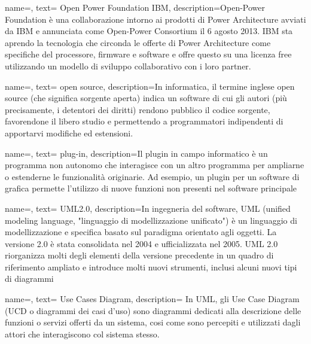 {
    name=,
    text= Open Power Foundation IBM,
    description={Open-Power Foundation è una collaborazione intorno ai prodotti di Power Architecture avviati da IBM e annunciata come Open-Power Consortium il 6 agosto 2013. IBM sta aprendo la tecnologia che circonda le offerte di Power Architecture come specifiche del processore, firmware e software e offre questo su una licenza free utilizzando un modello di sviluppo collaborativo con i loro partner.}
}




{
    name=,
    text= open source,
    description={In informatica, il termine inglese open source (che significa sorgente aperta) indica un software di cui gli autori (più precisamente, i detentori dei diritti) rendono pubblico il codice sorgente, favorendone il libero studio e permettendo a programmatori indipendenti di apportarvi modifiche ed estensioni.}
}

{
    name=,
    text= plug-in,
    description={Il plugin in campo informatico è un programma non autonomo che interagisce con un altro programma per ampliarne o estenderne le funzionalità originarie. Ad esempio, un plugin per un software di grafica permette l'utilizzo di nuove funzioni non presenti nel software principale}
}


{
    name=,
    text= UML2.0,
    description={In ingegneria del software, UML (unified modeling language, "linguaggio di modellizzazione unificato") è un linguaggio di modellizzazione e specifica basato
sul paradigma orientato agli oggetti. La versione 2.0 è stata consolidata nel 2004 e ufficializzata nel 2005. UML 2.0 riorganizza molti degli elementi della versione precedente in un quadro di riferimento ampliato e introduce molti nuovi strumenti, inclusi alcuni nuovi tipi di diagrammi }
}



{
    name=,
    text= Use Cases Diagram,
    description={ In UML, gli Use Case Diagram (UCD o diagrammi dei casi d'uso) sono diagrammi dedicati alla descrizione delle funzioni o servizi offerti da un sistema, cosi come sono percepiti e utilizzati dagli attori che interagiscono col sistema stesso.}
}










